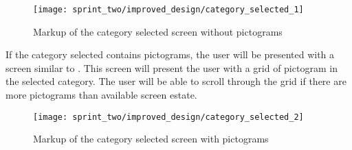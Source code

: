 \begin{figure}[!htbp]
    \centering
    \texttt{[image: sprint\_two/improved\_design/category\_selected\_1]}
    \caption{Markup of the category selected screen without pictograms}
    \label{fig:improved_design_category_selected_1}
\end{figure}

If the category selected contains pictograms, the user will be presented with a screen similar to . This screen will present the user with a grid of pictogram in the selected category. The user will be able to scroll through the grid if there are more pictograms than available screen estate. 

\begin{figure}[!htbp]
    \centering
    \texttt{[image: sprint\_two/improved\_design/category\_selected\_2]}
    \caption{Markup of the category selected screen with pictograms}
    \label{fig:improved_design_category_selected_2}
\end{figure}